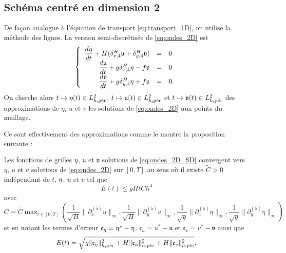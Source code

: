 \subsection{Schéma centré en dimension 2}

De façon analogue à l'équation de transport \eqref{eq:transport_1D}, on utilise la méthode des lignes. La version semi-discrétisée de \eqref{eq:ondes_2D} est
\begin{equation}
\left\lbrace
\begin{array}{rcl}
\dfrac{d \etafrak}{dt} + H ( \delta_{x,4}^H \mathfrak{u} + \delta_{y,4}^H \mathfrak{v} ) & = & 0 \\
\dfrac{d \mathfrak{u}}{dt} + g \delta_{x,4}^H \etafrak - f \mathfrak{v} & = & 0 \\
\dfrac{d \mathfrak{v}}{dt} + g \delta_{y,4}^H \etafrak + f \mathfrak{u} & = & 0. \\
\end{array}
\right.
\label{eq:ondes_2D_SD}
\end{equation}
On cherche alors $t \mapsto \etafrak(t) \in L^2_{h,\per}$, $t \mapsto \mathfrak{u}(t) \in L^2_{h,\per}$ et $t \mapsto \mathfrak{v}(t) \in L^2_{h,\per}$ des approximations de $\eta$, $u$ et $v$ les solutions de \eqref{eq:ondes_2D} aux points du maillage.

Ce sont effectivement des approximations comme le montre la proposition suivante :

\begin{proposition}
Les fonctions de grilles $\etafrak$, $\mathfrak{u}$ et $\mathfrak{v}$ solutions de \eqref{eq:ondes_2D_SD} convergent vers $\eta$, $u$ et $v$ solutions de \eqref{eq:ondes_2D} sur $[0,T]$ au sens où il existe $\tilde{C}>0$ indépendant de $t$, $\etafrak$, $u$ et $v$ tel que
\begin{equation}
E(t) \leq g H t C h^4
\end{equation}
avec $C = \tilde{C} \max_{t \in [0,T]} \left( \dfrac{1}{\sqrt{H}} \| \partial_x^{(5)} u \|_{\infty}, \dfrac{1}{\sqrt{H}} \| \partial_y^{(5)} v \|_{\infty}, \dfrac{1}{\sqrt{g}} \| \partial_x^{(5)} \eta \|_{\infty}, \dfrac{1}{\sqrt{g}} \| \partial_y^{(5)} \eta \|_{\infty}  \right)$
et en notant les termes d'erreur $\mathfrak{e}_{\eta} = \eta^* - \etafrak$, $\mathfrak{e}_{u} = u^* - \mathfrak{u}$ et $\mathfrak{e}_{v} = v^* - \mathfrak{v}$ ainsi que 
\begin{equation}
E(t) = \sqrt{ g \| \mathfrak{e}_{\eta} \|^2_{h,\per} + H \| \mathfrak{e}_u \|^2_{h,\per} + H \| \mathfrak{e}_v \|^2_{h,\per}}.
\end{equation}
\end{proposition}

